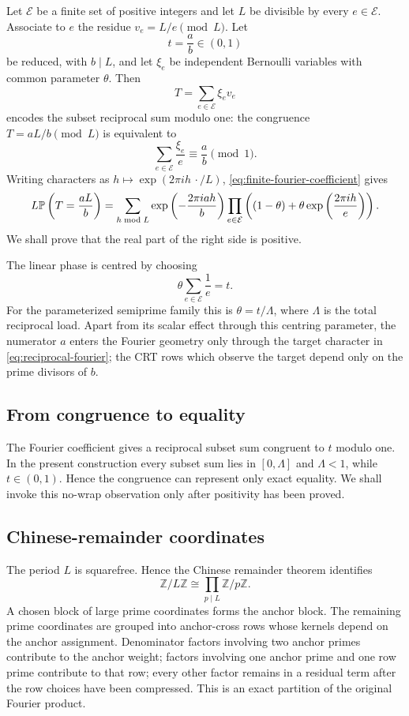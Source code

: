 Let $\mathcal E$ be a finite set of positive integers and let $L$ be divisible by every $e\in\mathcal E$. Associate to $e$ the residue $v_e=L/e\pmod L$. Let
\[
 t=\frac ab\in(0,1)
\]
be reduced, with $b\mid L$, and let $\xi_e$ be independent Bernoulli variables with common parameter $\theta$. Then
\[
 T=\sum_{e\in\mathcal E}\xi_ev_e
\]
encodes the subset reciprocal sum modulo one: the congruence $T=aL/b\pmod L$ is equivalent to
\[
 \sum_{e\in\mathcal E}\frac{\xi_e}{e}\equiv\frac ab\pmod1.
\]
Writing characters as $h\mapsto\exp(2\pi i h\,\cdot/L)$, \cref{eq:finite-fourier-coefficient} gives
\begin{equation}
\label{eq:reciprocal-fourier}
 L\mathbb{P}\left(T=\frac{aL}{b}\right)=\sum_{h\bmod L}\exp\left(-\frac{2\pi i a h}{b}\right)\prod_{e\in\mathcal E}\left((1-\theta)+\theta\exp\left(\frac{2\pi i h}{e}\right)\right).
\end{equation}
We shall prove that the real part of the right side is positive.

The linear phase is centred by choosing
\begin{equation}
\label{eq:theta-centering}
 \theta\sum_{e\in\mathcal E}\frac1e=t.
\end{equation}
For the parameterized semiprime family this is $\theta=t/\Lambda$, where $\Lambda$ is the total reciprocal load. Apart from its scalar effect through this centring parameter, the numerator $a$ enters the Fourier geometry only through the target character in \cref{eq:reciprocal-fourier}; the CRT rows which observe the target depend only on the prime divisors of $b$.

\subsection{From congruence to equality}

The Fourier coefficient gives a reciprocal subset sum congruent to $t$ modulo one. In the present construction every subset sum lies in $[0,\Lambda]$ and $\Lambda<1$, while $t\in(0,1)$. Hence the congruence can represent only exact equality. We shall invoke this no-wrap observation only after positivity has been proved.

\subsection{Chinese-remainder coordinates}

The period $L$ is squarefree. Hence the Chinese remainder theorem identifies
\[
 \mathbb Z/L\mathbb Z\cong\prod_{p\mid L}\mathbb Z/p\mathbb Z.
\]
A chosen block of large prime coordinates forms the anchor block. The remaining prime coordinates are grouped into anchor-cross rows whose kernels depend on the anchor assignment. Denominator factors involving two anchor primes contribute to the anchor weight; factors involving one anchor prime and one row prime contribute to that row; every other factor remains in a residual term after the row choices have been compressed. This is an exact partition of the original Fourier product.


